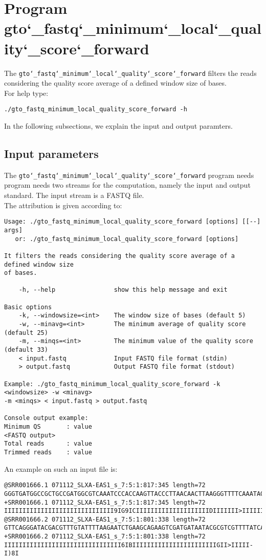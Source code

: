 \section{Program gto\char`_fastq\char`_minimum\char`_local\char`_quality\char`_score\char`_forward}
The \texttt{gto\char`_fastq\char`_minimum\char`_local\char`_quality\char`_score\char`_forward} filters the reads considering the quality score average of a defined window size of bases.\\
For help type:
\begin{lstlisting}
./gto_fastq_minimum_local_quality_score_forward -h
\end{lstlisting}
In the following subsections, we explain the input and output paramters.

\subsection*{Input parameters}

The \texttt{gto\char`_fastq\char`_minimum\char`_local\char`_quality\char`_score\char`_forward} program needs program needs two streams for the computation, namely the input and output standard. The input stream is a FASTQ file.\\
The attribution is given according to:
\begin{lstlisting}
Usage: ./gto_fastq_minimum_local_quality_score_forward [options] [[--] args]
   or: ./gto_fastq_minimum_local_quality_score_forward [options]

It filters the reads considering the quality score average of a defined window size 
of bases.

    -h, --help                show this help message and exit

Basic options
    -k, --windowsize=<int>    The window size of bases (default 5)
    -w, --minavg=<int>        The minimum average of quality score (default 25)
    -m, --minqs=<int>         The minimum value of the quality score (default 33)
    < input.fastq             Input FASTQ file format (stdin)
    > output.fastq            Output FASTQ file format (stdout)

Example: ./gto_fastq_minimum_local_quality_score_forward -k <windowsize> -w <minavg> 
-m <minqs> < input.fastq > output.fastq

Console output example:
Minimum QS       : value
<FASTQ output>
Total reads      : value
Trimmed reads    : value
\end{lstlisting}
An example on such an input file is:
\begin{lstlisting}
@SRR001666.1 071112_SLXA-EAS1_s_7:5:1:817:345 length=72
GGGTGATGGCCGCTGCCGATGGCGTCAAATCCCACCAAGTTACCCTTAACAACTTAAGGGTTTTCAAATAGA
+SRR001666.1 071112_SLXA-EAS1_s_7:5:1:817:345 length=72
IIIIIIIIIIIIIIIIIIIIIIIIIIIIII9IG9ICIIIIIIIIIIIIIIIIIIIIDIIIIIII>IIIIII/
@SRR001666.2 071112_SLXA-EAS1_s_7:5:1:801:338 length=72
GTTCAGGGATACGACGTTTGTATTTTAAGAATCTGAAGCAGAAGTCGATGATAATACGCGTCGTTTTATCAT
+SRR001666.2 071112_SLXA-EAS1_s_7:5:1:801:338 length=72
IIIIIIIIIIIIIIIIIIIIIIIIIIIIIIII6IBIIIIIIIIIIIIIIIIIIIIIIIGII>IIIII-I)8I
\end{lstlisting}


